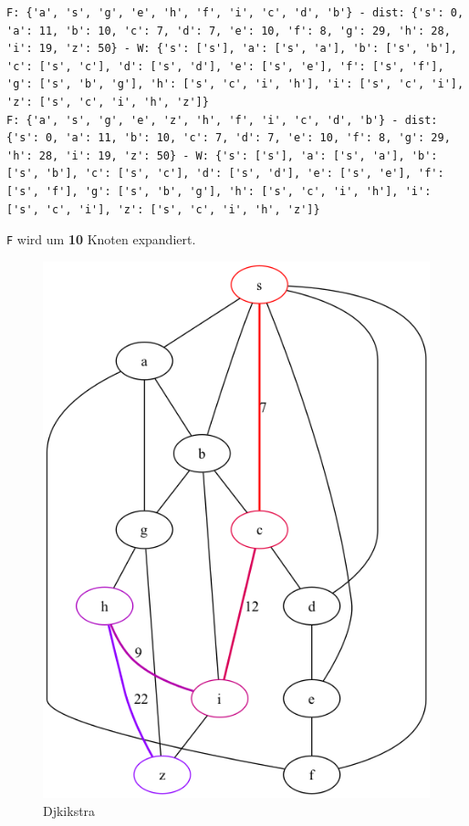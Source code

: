 \documentclass[a4paper,11pt]{report}
\begin{document}
\begin{verbatim}
F: {'a', 's', 'g', 'e', 'h', 'f', 'i', 'c', 'd', 'b'} - dist: {'s': 0, 'a': 11, 'b': 10, 'c': 7, 'd': 7, 'e': 10, 'f': 8, 'g': 29, 'h': 28, 'i': 19, 'z': 50} - W: {'s': ['s'], 'a': ['s', 'a'], 'b': ['s', 'b'], 'c': ['s', 'c'], 'd': ['s', 'd'], 'e': ['s', 'e'], 'f': ['s', 'f'], 'g': ['s', 'b', 'g'], 'h': ['s', 'c', 'i', 'h'], 'i': ['s', 'c', 'i'], 'z': ['s', 'c', 'i', 'h', 'z']}
F: {'a', 's', 'g', 'e', 'z', 'h', 'f', 'i', 'c', 'd', 'b'} - dist: {'s': 0, 'a': 11, 'b': 10, 'c': 7, 'd': 7, 'e': 10, 'f': 8, 'g': 29, 'h': 28, 'i': 19, 'z': 50} - W: {'s': ['s'], 'a': ['s', 'a'], 'b': ['s', 'b'], 'c': ['s', 'c'], 'd': ['s', 'd'], 'e': ['s', 'e'], 'f': ['s', 'f'], 'g': ['s', 'b', 'g'], 'h': ['s', 'c', 'i', 'h'], 'i': ['s', 'c', 'i'], 'z': ['s', 'c', 'i', 'h', 'z']}
\end{verbatim}

\texttt{F} wird um \textbf{10} Knoten expandiert.

\begin{figure}[htbp]
    \centering
    \includegraphics[height=0.2\textheight]{notebooks/assets/aufgabe_05/djikstra.png}
    \caption{Djkikstra}
    \label{fig:djkistra_graph}
\end{figure}
\end{document}

